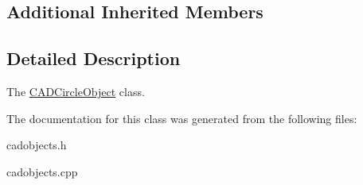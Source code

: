 \subsection*{Additional Inherited Members}


\subsection{Detailed Description}
The \hyperlink{class_c_a_d_circle_object}{C\+A\+D\+Circle\+Object} class. 

The documentation for this class was generated from the following files\+:\begin{DoxyCompactItemize}
\item 
cadobjects.\+h\item 
cadobjects.\+cpp\end{DoxyCompactItemize}

